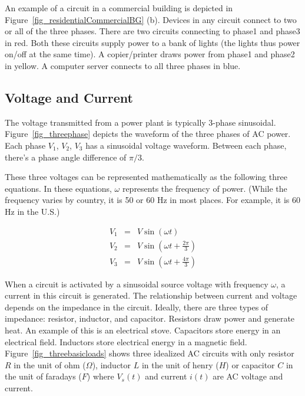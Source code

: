 An example of
a circuit in a commercial building is
depicted in Figure~\ref{fig_residentialCommercialBG} (b).
Devices in any circuit connect to two or all of 
the three phases. 
There are two circuits connecting to phase1 and phase3 in red.
Both these circuits supply power to a bank of lights (the lights
thus power on/off at the same time).
A copier/printer draws power from phase1 and phase2 in yellow. 
A computer server connects to all three phases in blue.

\subsection{Voltage and Current}
The voltage transmitted from
a power plant is typically 3-phase sinusoidal.
Figure~\ref{fig_threephase} depicts the
waveform of the three phases of AC power.
Each phase $V_1$, $V_2$, $V_3$ has a sinusoidal
voltage waveform. Between each phase,
there's a phase angle difference of $\pi/3$.


These three voltages can be represented mathematically
as the following three equations.
In these equations,
$\omega$ represents the frequency of
power. (While the frequency varies by country, it is 50 or 60 Hz in most 
places. For example, it is 60 Hz in the U.S.)

\begin{eqnarray*}
\label{eq_sinusoidal}
V_1&=& V\sin(\omega t) \\
V_2&=& V\sin(\omega t + \frac{2\pi}{3}) \\
V_3&=& V\sin(\omega t+\frac{4\pi}{3})
\end{eqnarray*}

When a circuit is activated by a sinusoidal source voltage
with frequency $\omega$,
a current in this circuit is generated.
The relationship between current and voltage depends on
the impedance in the circuit.
Ideally, there are three types of impedance: resistor,
inductor, and capacitor.
Resistors draw power and generate heat.
An example of this is an electrical stove.
Capacitors store energy in an electrical field.
Inductors store electrical energy in a magnetic field.
Figure~\ref{fig_threebasicloads} shows three idealized AC circuits
with only resistor $R$ in the unit of ohm ($\Omega$), inductor $L$ in the unit of henry ($H$) or capacitor $C$ in the unit of faradays ($F$)
where $V_s(t)$ and current $i(t)$ are AC voltage and current.  


